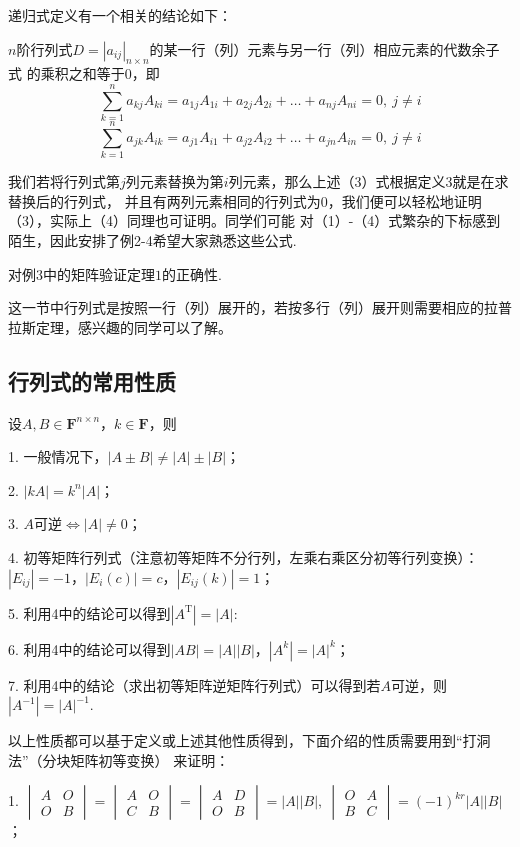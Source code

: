 递归式定义有一个相关的结论如下：
\begin{theorem}
	$n$阶行列式$D=|a_{ij}|_{n \times n}$的某一行（列）元素与另一行（列）相应元素的代数余子式
	的乘积之和等于$0$，即
	\begin{equation}
		\sum_{k=1}^{n}a_{kj}A_{ki}=a_{1j}A_{1i}+a_{2j}A_{2i}+\dots+a_{nj}A_{ni}=0,\ j \neq i
	\end{equation}
	\begin{equation}
		\sum_{k=1}^{n}a_{jk}A_{ik}=a_{j1}A_{i1}+a_{j2}A_{i2}+\dots+a_{jn}A_{in}=0,\ j \neq i
	\end{equation}
\end{theorem}
我们若将行列式第$j$列元素替换为第$i$列元素，那么上述（3）式根据定义3就是在求替换后的行列式，
并且有两列元素相同的行列式为0，我们便可以轻松地证明（3），实际上（4）同理也可证明。同学们可能
对（1）-（4）式繁杂的下标感到陌生，因此安排了例2-4希望大家熟悉这些公式.
\begin{example}
	对例$3$中的矩阵验证定理$1$的正确性.
\end{example}
这一节中行列式是按照一行（列）展开的，若按多行（列）展开则需要相应的拉普拉斯定理，感兴趣的同学可以了解。
\subsection{行列式的常用性质}
设$A,B \in \mathbf{F}^{n \times n}$，$k \in \mathbf{F}$，则

1. 一般情况下，$|A \pm B| \neq |A|\pm|B|$；

2. $|kA|=k^n|A|$；

3. $A$可逆$\iff |A| \neq 0$；

4. 初等矩阵行列式（注意初等矩阵不分行列，左乘右乘区分初等行列变换）：$|E_{ij}|=-1$，$|E_i(c)|=c$，$|E_{ij}(k)|=1$；

5. 利用4中的结论可以得到$|A^\mathrm{T}|=|A|$:

6. 利用4中的结论可以得到$|AB|=|A||B|$，$|A^k|=|A|^k$；

7. 利用4中的结论（求出初等矩阵逆矩阵行列式）可以得到若$A$可逆，则$|A^{-1}|=|A|^{-1}$.

以上性质都可以基于定义或上述其他性质得到，下面介绍的性质需要用到“打洞法”（分块矩阵初等变换）
来证明：

1. $\begin{vmatrix}
	A & O \\ O & B
\end{vmatrix} = \begin{vmatrix}
	A & O \\ C & B
\end{vmatrix} = \begin{vmatrix}
	A & D \\ O & B
\end{vmatrix} = |A||B|,\ \begin{vmatrix}
	O & A \\ B & C
\end{vmatrix} = (-1)^{kr}|A||B|$；

